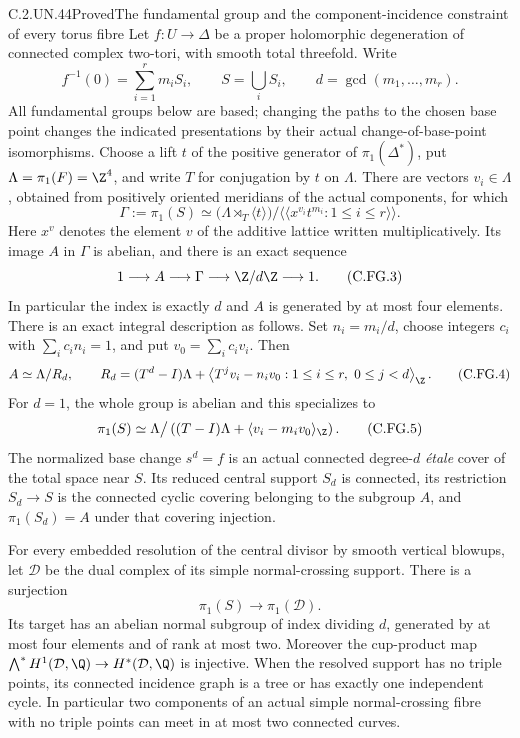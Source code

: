 \begin{statement}{C.2.UN.44}{Proved}{The fundamental group and the component-incidence constraint of every torus fibre}
Let $f:U\to\Delta$ be a proper holomorphic degeneration of connected
complex two-tori, with smooth total threefold. Write
\[
 f^{-1}(0)=\sum_{i=1}^r m_iS_i,\qquad
 S=\bigcup_iS_i,\qquad d=\gcd(m_1,\ldots,m_r).
                                                        \tag{C.FG.1}
\]
All fundamental groups below are based; changing the paths to the
chosen base point changes the indicated presentations by their actual
change-of-base-point isomorphisms. Choose a lift $t$ of the positive
generator of $\pi_1(\Delta^*)$, put $\Lambda=\pi_1(F)=\Z^4$, and
write $T$ for conjugation by $t$ on $\Lambda$. There are vectors
$v_i\in\Lambda$, obtained from positively oriented meridians of the
actual components, for which
\[
 \Gamma:=\pi_1(S)
  \simeq
  \bigl(\Lambda\rtimes_T\langle t\rangle\bigr)
       \big/\langle\!\langle x^{v_i}t^{m_i}:1\le i\le r
                    \rangle\!\rangle .                \tag{C.FG.2}
\]
Here $x^v$ denotes the element $v$ of the additive lattice written
multiplicatively. Its image $A$ in $\Gamma$ is abelian, and there is
an exact sequence
\[
       1\longrightarrow A\longrightarrow\Gamma
          \longrightarrow\Z/d\Z\longrightarrow1 .    \tag{C.FG.3}
\]
In particular the index is exactly $d$ and $A$ is generated by at most
four elements. There is an exact integral description as follows.
Set $n_i=m_i/d$, choose integers $c_i$ with $\sum_i c_in_i=1$, and
put $v_0=\sum_i c_iv_i$. Then
\[
 A\simeq\Lambda/R_d,\qquad
 R_d=(T^d-I)\Lambda+
       \left\langle T^jv_i-n_iv_0:
                         1\le i\le r,\ 0\le j<d\right\rangle_{\Z}.
                                                        \tag{C.FG.4}
\]
For $d=1$, the whole group is abelian and this specializes to
\[
 \pi_1(S)\simeq
   \Lambda\big/\left((T-I)\Lambda+
                   \langle v_i-m_iv_0\rangle_{\Z}\right).
                                                        \tag{C.FG.5}
\]
The normalized base change $s^d=f$ is an actual connected degree-$d$
\emph{\'etale} cover of the total space near $S$. Its reduced central
support $S_d$ is connected, its restriction $S_d\to S$ is the
connected cyclic covering belonging to the subgroup $A$, and
$\pi_1(S_d)=A$ under that covering injection.

For every embedded resolution of the central divisor by smooth
vertical blowups, let $\mathcal D$ be the dual complex of its simple
normal-crossing support. There is a surjection
\[
                  \pi_1(S)\longrightarrow\pi_1(\mathcal D).
                                                        \tag{C.FG.6}
\]
Its target has an abelian normal subgroup of index dividing $d$,
generated by at most four elements and of rank at most two.
Moreover the cup-product map
$\bigwedge^*H^1(\mathcal D,\Q)\to H^*(\mathcal D,\Q)$ is injective.
When the resolved support has
no triple points, its connected incidence graph is a tree or has
exactly one independent cycle. In particular two components of an
actual simple normal-crossing fibre with no triple points can meet
in at most two connected curves.


\end{statement}

